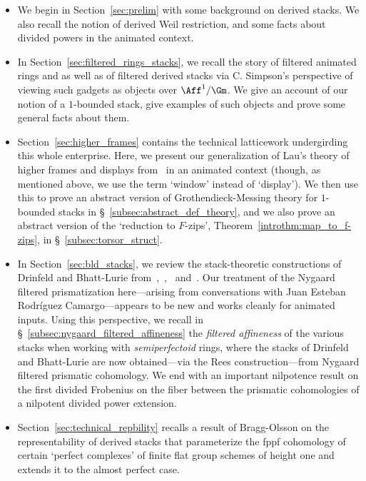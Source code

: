 \documentclass[10pt]{amsart}
\begin{document}
\begin{itemize}
   \item We begin in Section~\ref{sec:prelim} with some background on derived stacks. We also recall the notion of derived Weil restriction, and some facts about divided powers in the animated context.
   \item In Section~\ref{sec:filtered_rings_stacks}, we recall the story of filtered animated rings and as well as of filtered derived stacks via C. Simpson's perspective of viewing such gadgets as objects over $\Aff^1/\Gm$. We give an account of our notion of a $1$-bounded stack, give examples of such objects and prove some general facts about them.
   \item Section~\ref{sec:higher_frames} contains the technical latticework undergirding this whole enterprise. Here, we present our generalization of Lau's theory of higher frames and displays from~\cite{MR4355476} in an animated context (though, as mentioned above, we use the term `window' instead of `display'). We then use this to prove an abstract version of Grothendieck-Messing theory for $1$-bounded stacks in \S~\ref{subsec:abstract_def_theory}, and we also prove an abstract version of the `reduction to $F$-zips', Theorem~\ref{introthm:map_to_f-zips}, in \S~\ref{subsec:torsor_struct}.
   \item In Section~\ref{sec:bld_stacks}, we review the stack-theoretic constructions of Drinfeld and Bhatt-Lurie from~\cite{bhatt_lectures},~\cite{bhatt2022absolute},~\cite{bhatt2022prismatization} and~\cite{drinfeld2022prismatization}. Our treatment of the Nygaard filtered prismatization here---arising from conversations with Juan Esteban Rodr\'iguez Camargo---appears to be new and works cleanly for animated inputs. Using this perspective, we recall in \S~\ref{subsec:nygaard_filtered_affineness} the \emph{filtered affineness} of the various stacks when working with \emph{semiperfectoid} rings, where the stacks of Drinfeld and Bhatt-Lurie are now obtained---via the Rees construction---from Nygaard filtered prismatic cohomology. We end with an important nilpotence result on the first divided Frobenius on the fiber between the prismatic cohomologies of a nilpotent divided power extension.
   \item Section~\ref{sec:technical_repbility} recalls a result of Bragg-Olsson on the representability of derived stacks that parameterize the fppf cohomology of certain `perfect complexes' of finite flat group schemes of height one and extends it to the almost perfect case.

\end{itemize}
\end{document}
